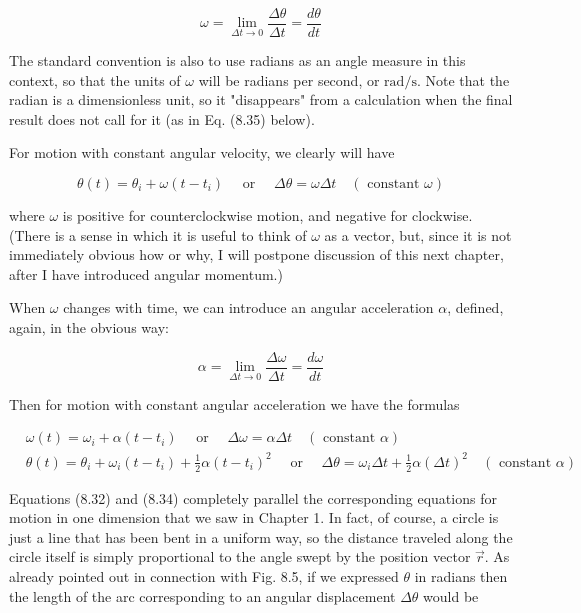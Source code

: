 \documentclass[10pt]{article}
\begin{document}
\begin{equation*}
\omega=\lim _{\Delta t \rightarrow 0} \frac{\Delta \theta}{\Delta t}=\frac{d \theta}{d t} \tag{8.31}
\end{equation*}


The standard convention is also to use radians as an angle measure in this context, so that the units of $\omega$ will be radians per second, or $\mathrm{rad} / \mathrm{s}$. Note that the radian is a dimensionless unit, so it "disappears" from a calculation when the final result does not call for it (as in Eq. (8.35) below).

For motion with constant angular velocity, we clearly will have


\begin{equation*}
\theta(t)=\theta_{i}+\omega\left(t-t_{i}\right) \quad \text { or } \quad \Delta \theta=\omega \Delta t \quad(\text { constant } \omega) \tag{8.32}
\end{equation*}


where $\omega$ is positive for counterclockwise motion, and negative for clockwise. (There is a sense in which it is useful to think of $\omega$ as a vector, but, since it is not immediately obvious how or why, I will postpone discussion of this next chapter, after I have introduced angular momentum.)

When $\omega$ changes with time, we can introduce an angular acceleration $\alpha$, defined, again, in the obvious way:


\begin{equation*}
\alpha=\lim _{\Delta t \rightarrow 0} \frac{\Delta \omega}{\Delta t}=\frac{d \omega}{d t} \tag{8.33}
\end{equation*}


Then for motion with constant angular acceleration we have the formulas


\begin{align*}
& \omega(t)=\omega_{i}+\alpha\left(t-t_{i}\right) \quad \text { or } \quad \Delta \omega=\alpha \Delta t \quad(\text { constant } \alpha) \\
& \theta(t)=\theta_{i}+\omega_{i}\left(t-t_{i}\right)+\frac{1}{2} \alpha\left(t-t_{i}\right)^{2} \quad \text { or } \quad \Delta \theta=\omega_{i} \Delta t+\frac{1}{2} \alpha(\Delta t)^{2} \quad(\text { constant } \alpha) \tag{8.34}
\end{align*}


Equations (8.32) and (8.34) completely parallel the corresponding equations for motion in one dimension that we saw in Chapter 1. In fact, of course, a circle is just a line that has been bent in a uniform way, so the distance traveled along the circle itself is simply proportional to the angle swept by the position vector $\vec{r}$. As already pointed out in connection with Fig. 8.5, if we expressed $\theta$ in radians then the length of the arc corresponding to an angular displacement $\Delta \theta$ would be
\end{document}
